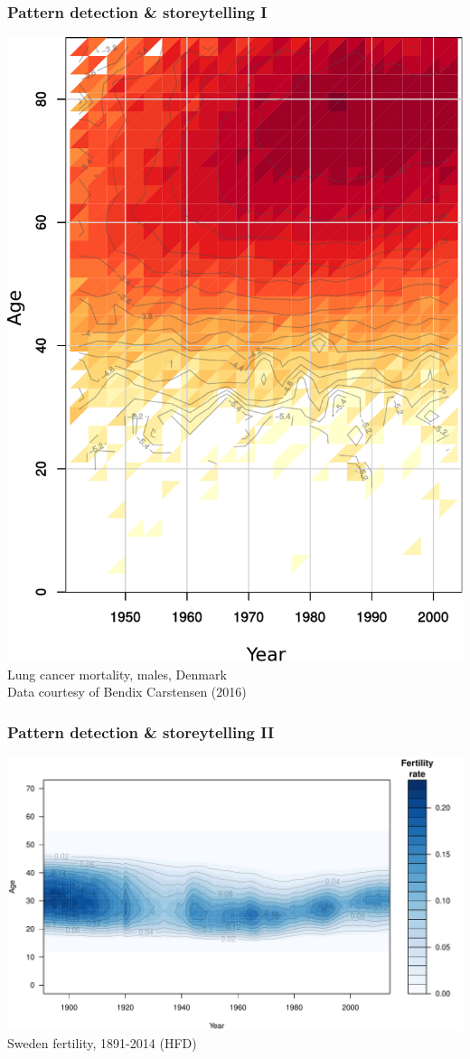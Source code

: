 \documentclass[20pt]{beamer}
\begin{document}
\begin{frame}
\frametitle{Pattern detection \& storeytelling I}
\includegraphics[scale=.7]{Figures/LungCancerDenmark.pdf}\\
Lung cancer mortality, males, Denmark\\
Data courtesy of Bendix Carstensen (2016)
\end{frame}

\begin{frame}
\frametitle{Pattern detection \& storeytelling II}
\includegraphics[scale=.85]{Figures/FertAPC.pdf}\\
Sweden fertility, 1891-2014 (HFD)
\end{frame}
\end{document}
